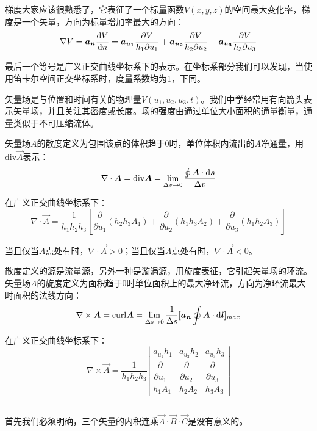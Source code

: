 梯度大家应该很熟悉了，它表征了一个标量函数$V(x,y,z)$的空间最大变化率，梯度是一个矢量，方向为标量增加率最大的方向：
\[\nabla V = \vec{a_n}\dfrac{\dif V}{\dif n} = \vec{a_{u_1}}\dfrac{\partial V}{h_1\partial u_1} + \vec{a_{u_2}}\dfrac{\partial V}{h_2\partial u_2} + \vec{a_{u_3}}\dfrac{\partial V}{h_3\partial u_3}\]

最后一个等号是广义正交曲线坐标系下的表示。在坐标系部分我们可以发现，当使用笛卡尔空间正交坐标系时，度量系数均为1，下同。

矢量场是与位置和时间有关的物理量$V(u_1,u_2,u_3,t)$。我们中学经常用有向箭头表示矢量场，并且关注其密度或长度。场的强度由通过单位大小面积的通量衡量，通量类似于不可压缩流体。

矢量场$A$的散度定义为包围该点的体积趋于0时，单位体积内流出的$A$净通量，用$\text{div} \vec{A}$表示：
\[\nabla\cdot \vec{A} = \text{div} \vec{A} = \lim_{\Delta v\to 0} \dfrac{\oint \vec{A}\cdot \dif\vec{s}}{\Delta v}\]

在广义正交曲线坐标系下：
\[\nabla\cdot \vec{A} = \dfrac{1}{h_1h_2h_3}[\dfrac{\partial}{\partial u_1}(h_2h_3A_1) + \dfrac{\partial}{\partial u_2}(h_1h_3A_2) + \dfrac{\partial}{\partial u_3}(h_1h_2A_3)]\]

当且仅当$A$点处有时，$\nabla\cdot \vec{A} > 0$；当且仅当$A$点处有时，$\nabla\cdot \vec{A} < 0$。

散度定义的源是流量源，另外一种是漩涡源，用旋度表征，它引起矢量场的环流。
矢量场$A$的旋度定义为面积趋于0时单位面积上的最大净环流，方向为净环流最大时面积的法线方向：
\[\nabla\times\vec{A} = \text{curl}\vec{A} = \lim_{\Delta s\to 0}\dfrac{1}{\Delta s}[\vec{a_n}\oint \vec{A}\cdot\dif \vec{l}]_{max}\]

在广义正交曲线坐标系下：
\begin{equation*}
    \nabla\times\vec{A}
    =
    \dfrac{1}{h_1h_2h_3}
    \left|
        \begin{array}{ccc}
            a_{u_1}h_1 & a_{u_2}h_2 & a_{u_3}h_3\\
            \dfrac{\partial}{\partial u_1} & \dfrac{\partial}{\partial u_2} & \dfrac{\partial}{\partial u_3}\\
            h_1A_1 & h_2A_2 & h_3A_3
        \end{array}
    \right|
\end{equation*}
\subsection[矢量恒等式与相关定理]{}
首先我们必须明确，三个矢量的内积连乘$\vec{A}\cdot\vec{B}\cdot\vec{C}$是没有意义的。

